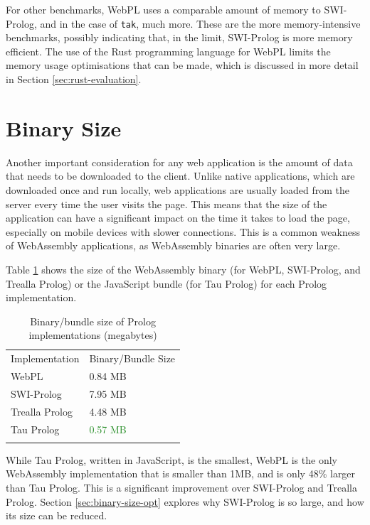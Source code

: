 For other benchmarks, WebPL uses a comparable amount of memory to SWI-Prolog, and in the case of \texttt{tak}, much more. These are the more memory-intensive benchmarks, possibly indicating that, in the limit, SWI-Prolog is more memory efficient. The use of the Rust programming language for WebPL limits the memory usage optimisations that can be made, which is discussed in more detail in Section \ref{sec:rust-evaluation}.

\section{Binary Size}

\label{sec:binary-size}

Another important consideration for any web application is the amount of data that needs to be downloaded to the client. Unlike native applications, which are downloaded once and run locally, web applications are usually loaded from the server every time the user visits the page. This means that the size of the application can have a significant impact on the time it takes to load the page, especially on mobile devices with slower connections. This is a common weakness of WebAssembly applications, as WebAssembly binaries are often very large.

Table \ref{tab:binary-size} shows the size of the WebAssembly binary (for WebPL, SWI-Prolog, and Trealla Prolog) or the JavaScript bundle (for Tau Prolog) for each Prolog implementation.

\begin{table}[H]
\centering
\begin{tabular}{ll}
\addlinespace\hline\addlinespace
Implementation & Binary/Bundle Size \\
\addlinespace\hline\addlinespace
WebPL & 0.84 MB \\
SWI-Prolog & 7.95 MB \\
Trealla Prolog & 4.48 MB \\
Tau Prolog & \textcolor{ForestGreen}{0.57 MB} \\
\addlinespace\hline\addlinespace
\end{tabular}
\caption{Binary/bundle size of Prolog implementations (megabytes)}
\label{tab:binary-size}
\end{table}

While Tau Prolog, written in JavaScript, is the smallest, WebPL is the only WebAssembly implementation that is smaller than 1MB, and is only 48\% larger than Tau Prolog. This is a significant improvement over SWI-Prolog and Trealla Prolog. Section \ref{sec:binary-size-opt} explores why SWI-Prolog is so large, and how its size can be reduced.

